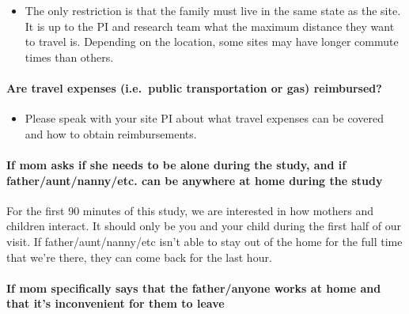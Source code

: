 \documentclass[
  12pt,
]{book}
\providecommand{\tightlist}{%
  \setlength{\itemsep}{0pt}\setlength{\parskip}{0pt}}
\begin{document}
\begin{itemize}
\tightlist
\item
  The only restriction is that the family must live in the same state as the site. It is up to the PI and research team what the maximum distance they want to travel is. Depending on the location, some sites may have longer commute times than others.
\end{itemize}

\hypertarget{are-travel-expenses-i.e.-public-transportation-or-gas-reimbursed}{%
\paragraph*{Are travel expenses (i.e.~public transportation or gas) reimbursed?}\label{are-travel-expenses-i.e.-public-transportation-or-gas-reimbursed}}

\begin{itemize}
\tightlist
\item
  Please speak with your site PI about what travel expenses can be covered and how to obtain reimbursements.
\end{itemize}

\hypertarget{if-mom-asks-if-she-needs-to-be-alone-during-the-study-and-if-fatherauntnannyetc.-can-be-anywhere-at-home-during-the-study}{%
\paragraph*{If mom asks if she needs to be alone during the study, and if father/aunt/nanny/etc. can be anywhere at home during the study}\label{if-mom-asks-if-she-needs-to-be-alone-during-the-study-and-if-fatherauntnannyetc.-can-be-anywhere-at-home-during-the-study}}

For the first 90 minutes of this study, we are interested in how mothers and children interact. It should only be you and your child during the first half of our visit. If father/aunt/nanny/etc isn't able to stay out of the home for the full time that we're there, they can come back for the last hour.

\hypertarget{if-mom-specifically-says-that-the-fatheranyone-works-at-home-and-that-its-inconvenient-for-them-to-leave}{%
\paragraph*{If mom specifically says that the father/anyone works at home and that it's inconvenient for them to leave}\label{if-mom-specifically-says-that-the-fatheranyone-works-at-home-and-that-its-inconvenient-for-them-to-leave}}
\end{document}
